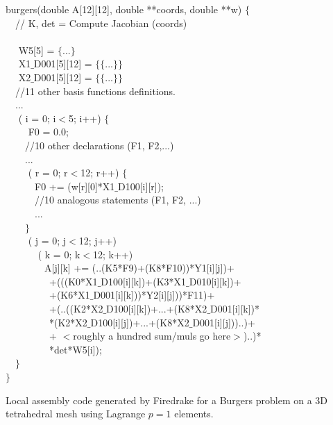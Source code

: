 \documentclass[conference]{IEEEtran}
\begin{document}
\begin{algorithm}[t]
\footnotesize
{} burgers(double A[12][12], double **coords, double **w) $\lbrace$\\
~~// K, det = Compute Jacobian (coords) \\
~~\\
~~ W5[5] = $\lbrace$...$\rbrace$\\
~~ X1$\_$D001[5][12] = $\lbrace\lbrace$...$\rbrace\rbrace$\\
~~ X2$\_$D001[5][12] = $\lbrace\lbrace$...$\rbrace\rbrace$\\
~~//11 other basis functions definitions.\\
~~...\\
~~ ( i = 0; i$<$5; i++) $\lbrace$\\
~~~~ F0 = 0.0;\\
~~~~//10 other declarations (F1, F2,...)\\
~~~~...\\
~~~~ ( r = 0; r$<$12; r++) $\lbrace$\\
~~~~~~F0 += (w[r][0]*X1$\_$D100[i][r]);\\
~~~~~~//10 analogous statements (F1, F2, ...)\\
~~~~~~...\\
~~~~$\rbrace$\\
~~~~ ( j = 0; j$<$12; j++) \\
~~~~~~ ( k = 0; k$<$12; k++) \\
~~~~~~~~A[j][k] += (..(K5*F9)+(K8*F10))*Y1[i][j])+\\
~~~~~~~~~+(((K0*X1$\_$D100[i][k])+(K3*X1$\_$D010[i][k])+\\
~~~~~~~~~+(K6*X1$\_$D001[i][k]))*Y2[i][j]))*F11)+\\
~~~~~~~~~+(..((K2*X2$\_$D100[i][k])+...+(K8*X2$\_$D001[i][k])*\\
~~~~~~~~~*(K2*X2$\_$D100[i][j])+...+(K8*X2$\_$D001[i][j]))..)+\\
~~~~~~~~~+ $<$roughly a hundred sum/muls go here$>$)..)*\\
~~~~~~~~~*det*W5[i]);\\
~~$\rbrace$ \\
$\rbrace$
\caption{Local assembly code generated by Firedrake for a Burgers problem on a 3D tetrahedral mesh using Lagrange $p=1$ elements.}
\label{code:burgers}
\end{algorithm}
\end{document}
